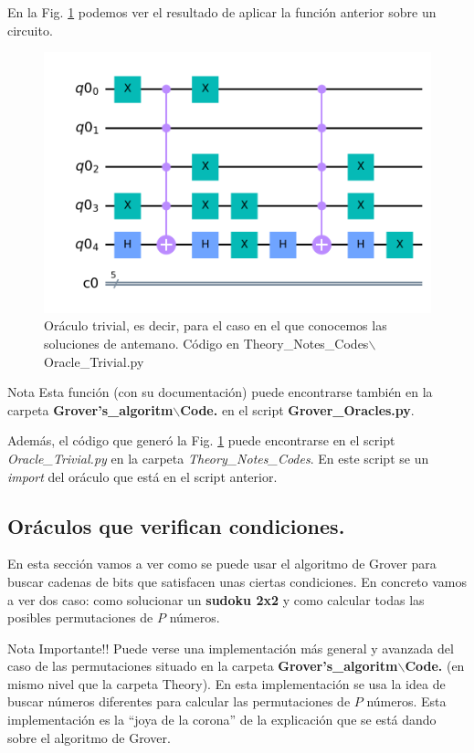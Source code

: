 \documentclass[a4paper,11pt]{article} %
\numberwithin{equation}{section}
\begin{document}
En la Fig. \ref{Fig_Imple_oracle_trivial} podemos ver el resultado de aplicar la función anterior sobre un circuito. 

	\begin{figure}[H]
	\centering 
	\includegraphics[width=0.6\linewidth]{Theory_Notes_Codes/Fig_Imple_oracle_trivial.png}
	\caption{Oráculo trivial, es decir, para el caso en el que conocemos las soluciones de antemano.  Código en Theory\_Notes\_Codes$\backslash$Oracle\_Trivial.py}
	\label{Fig_Imple_oracle_trivial}
	\end{figure}

	\begin{mybox}{Nota}
	Esta función (con su documentación) puede encontrarse también en la carpeta
	\textbf{Grover's\_algoritm$\backslash$Code.} en el script  \textbf{Grover\_Oracles.py}. 
	 
 	Además, el código que generó la Fig. \ref{Fig_Imple_oracle_trivial} puede encontrarse en el script 
	\textit{Oracle\_Trivial.py} en la carpeta \textit{Theory\_Notes\_Codes}. En este script se un \textit{import}
	del oráculo que está en el script anterior.
	\end{mybox}


\subsection{Oráculos que verifican condiciones.}

En esta sección vamos a ver como se puede usar el algoritmo de Grover para buscar cadenas de bits que satisfacen unas ciertas condiciones. En concreto vamos a ver dos caso: como solucionar un \textbf{sudoku 2x2} y como calcular todas las posibles permutaciones de $P$ números.

\begin{mybox_red}{Nota Importante!!}
Puede verse una implementación más general y avanzada del caso de las permutaciones situado en la carpeta \textbf{Grover's\_algoritm$\backslash$Code.} (en mismo nivel que la carpeta Theory). En esta implementación se usa la idea de buscar números diferentes para calcular las permutaciones de $P$ números. Esta implementación es la ``joya de la corona'' de la explicación que se está dando sobre el algoritmo de Grover.
\end{mybox_red}
\end{document}
